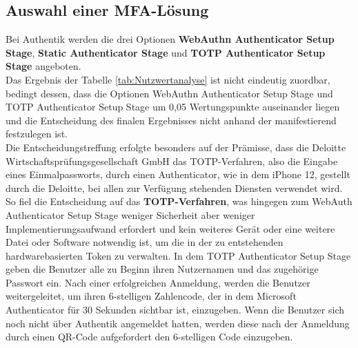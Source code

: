 \subsection{Auswahl einer MFA-Lösung}
\label{sec:Auswahl einer MFA-Lösung}
Bei Authentik werden die drei Optionen \textbf{WebAuthn Authenticator Setup Stage}, \textbf{Static Authenticator Stage} und 
\textbf{\acs{TOTP} Authenticator Setup Stage} angeboten. 
\\Das Ergebnis der Tabelle \ref*{tab:Nutzwertanalyse}  ist nicht eindeutig zuordbar, bedingt dessen, dass 
die Optionen WebAuthn Authenticator Setup Stage und \acs{TOTP} Authenticator Setup Stage um 0,05 Wertungspunkte auseinander liegen und 
die Entscheidung des finalen Ergebnisses nicht anhand der  manifestierend festzulegen ist.
\\Die Entscheidungstreffung erfolgte besonders auf der Prämisse, dass die Deloitte Wirtschaftsprüfungsgesellschaft GmbH das \acs{TOTP}-Verfahren, 
also die Eingabe eines Einmalpassworts, durch einen Authenticator, wie in dem iPhone 12, gestellt durch die Deloitte, bei allen zur Verfügung 
stehenden Diensten verwendet wird. So fiel die Entscheidung auf das \textbf{\acs{TOTP}-Verfahren}, was hingegen zum WebAuth Authenticator 
Setup Stage weniger Sicherheit aber weniger Implementierungsaufwand erfordert und kein weiteres Gerät oder eine weitere Datei oder Software 
notwendig ist, um die in der zu entstehenden hardwarebasierten Token zu verwalten. In dem \acs{TOTP} Authenticator Setup Stage geben die 
Benutzer alle zu Beginn ihren Nutzernamen und das zugehörige Passwort ein. Nach einer erfolgreichen Anmeldung, werden die 
Benutzer weitergeleitet, um ihren 6-stelligen Zahlencode, der in dem Microsoft Authenticator für 30 Sekunden sichtbar ist, einzugeben. 
Wenn die Benutzer sich noch nicht über Authentik angemeldet hatten, werden diese nach der Anmeldung durch einen QR-Code aufgefordert 
den 6-stelligen Code einzugeben.

